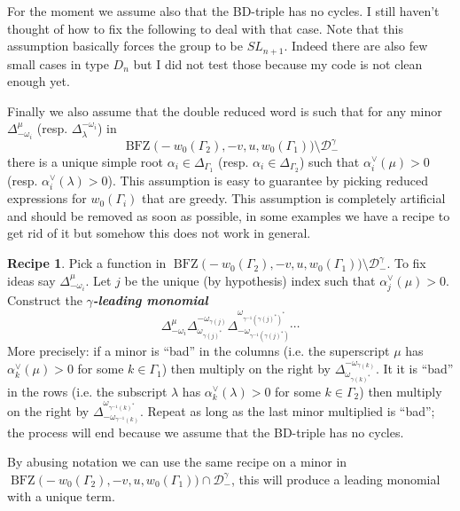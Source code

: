 \documentclass[a4paper]{amsart}
\theoremstyle{definition}
\newtheorem{recipe}[theorem]{Recipe}
\newcommand{\newword}[1]{\textbf{\emph{#1}}}
\begin{document}
For the moment we assume also that the BD-triple has no cycles.
I still haven't thought of how to fix the following to deal with that case.
Note that this assumption basically forces the group to be $SL_{n+1}$.
Indeed there are also few small cases in type $D_n$ but I did not test those because my code is not clean enough yet.

Finally we also assume that the double reduced word is such that for any minor $\Delta_{-\omega_i}^\mu$ (resp. $\Delta_{\lambda}^{-\omega_i}$) in 
\[
  \operatorname{BFZ}\big(-w_0(\Gamma_2),-v,u,w_0(\Gamma_1)\big)\setminus \mathcal{D}^\gamma_-
\]
there is a unique simple root $\alpha_i\in\Delta_{\Gamma_1}$ (resp. $\alpha_i\in\Delta_{\Gamma_2}$) such that $\alpha_i^\vee(\mu)>0$ (resp. $\alpha_i^\vee(\lambda)>0$).
This assumption is easy to guarantee by picking reduced expressions for $w_0(\Gamma_i)$ that are greedy.
This assumption is completely artificial and should be removed as soon as possible, in some examples we have a recipe to get rid of it but somehow this does not work in general.

\begin{recipe}
  Pick a function in $\operatorname{BFZ}\big(-w_0(\Gamma_2),-v,u,w_0(\Gamma_1)\big)\setminus \mathcal{D}^\gamma_-$. 
  To fix ideas say $\Delta_{-\omega_i}^\mu$.
  Let $j$ be the unique (by hypothesis) index such that $\alpha_j^\vee(\mu)>0$.
  Construct the \newword{$\gamma$-leading monomial}
  \[
    \Delta_{-\omega_i}^\mu 
    \Delta_{\omega_{\gamma(j)^*}}^{-\omega_{\gamma(j)}}
    \Delta_{-\omega_{\gamma^{-1}(\gamma(j)^*)}}^{\omega_{\gamma^{-1}(\gamma(j)^*)^*}}
    \cdots
  \]
  More precisely: if a minor is ``bad'' in the columns (i.e. the superscript $\mu$ has  $\alpha_k^\vee(\mu)>0$ for some $k\in\Gamma_1$) then multiply on the right by $\Delta_{\omega_{\gamma(k)^*}}^{-\omega_{\gamma(k)}}$.
  It it is ``bad'' in the rows (i.e. the subscript $\lambda$ has  $\alpha_k^\vee(\lambda)>0$ for some $k\in\Gamma_2$) then multiply on the right by $\Delta_{-\omega_{\gamma^{-1}(k)}}^{\omega_{\gamma^{-1}(k)^*}}$.
  Repeat as long as the last minor multiplied is ``bad''; the process will end because we assume that the BD-triple has no cycles.
\end{recipe}

By abusing notation we can use the same recipe on a minor in $\operatorname{BFZ}\big(-w_0(\Gamma_2),-v,u,w_0(\Gamma_1)\big)\cap \mathcal{D}^\gamma_-$, this will produce a leading monomial with a unique term.
\end{document}
